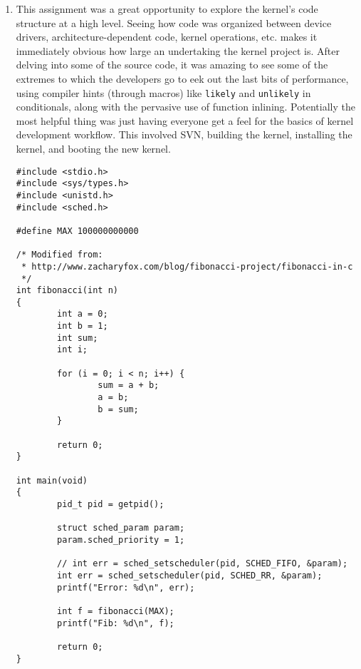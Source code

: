 \documentclass[12pt,letterpaper]{article}
\begin{document}
\begin{enumerate}
\item This assignment was a great opportunity to explore the kernel's code
  structure at a high level.  Seeing how code was organized between device
  drivers, architecture-dependent code, kernel operations, etc. makes it
  immediately obvious how large an undertaking the kernel project is.  After
  delving into some of the source code, it was amazing to see some of the
  extremes to which the developers go to eek out the last bits of performance,
  using compiler hints (through macros) like \texttt{likely} and
  \texttt{unlikely} in conditionals, along with the pervasive use of function
  inlining.  Potentially the most helpful thing was just having everyone get a
  feel for the basics of kernel development workflow.  This involved SVN,
  building the kernel, installing the kernel, and booting the new kernel.

\newpage

\begin{verbatim}
#include <stdio.h>
#include <sys/types.h>
#include <unistd.h>
#include <sched.h>

#define MAX 100000000000

/* Modified from:
 * http://www.zacharyfox.com/blog/fibonacci-project/fibonacci-in-c
 */
int fibonacci(int n)
{
        int a = 0;
        int b = 1;
        int sum;
        int i;

        for (i = 0; i < n; i++) {
                sum = a + b;
                a = b;
                b = sum;
        }

        return 0;
}

int main(void)
{
        pid_t pid = getpid();

        struct sched_param param;
        param.sched_priority = 1;

        // int err = sched_setscheduler(pid, SCHED_FIFO, &param);
        int err = sched_setscheduler(pid, SCHED_RR, &param);
        printf("Error: %d\n", err);

        int f = fibonacci(MAX);
        printf("Fib: %d\n", f);

        return 0;
}
\end{verbatim}

\end{enumerate}
\end{document}
